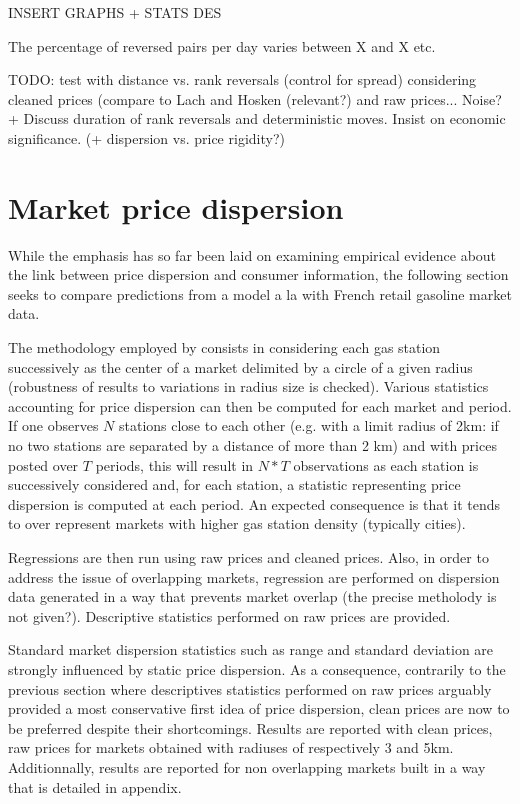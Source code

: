 \documentclass[11pt]{article}
\begin{document}
INSERT GRAPHS + STATS DES

The percentage of reversed pairs per day varies between X and X etc.

TODO: test with distance vs. rank reversals (control for spread) considering cleaned prices (compare to Lach and Hosken (relevant?) and raw prices... Noise? + Discuss duration of rank reversals and deterministic moves. Insist on economic significance. (+ dispersion vs. price rigidity?)

\section{Market price dispersion}

While the emphasis has so far been laid on examining empirical evidence about the link between price dispersion and consumer information, the following section seeks to compare predictions from a model a la \cite{VAR80} with French retail gasoline market data.

The methodology employed by \cite{TAP11} consists in considering each gas station successively as the center of a market delimited by a circle of a given radius (robustness of results to variations in radius size is checked). Various statistics accounting for price dispersion can then be computed for each market and period. If one observes $N$ stations close to each other (e.g. with a limit radius of 2km: if no two stations are separated by a distance of more than 2 km) and with prices posted over $T$ periods, this will result in $N*T$ observations as each station is successively considered and, for each station, a statistic representing price dispersion is computed at each period. An expected consequence is that it tends to over represent markets with higher gas station density (typically cities).

Regressions are then run using raw prices and cleaned prices. Also, in order to address the issue of overlapping markets, regression are performed on dispersion data generated in a way that prevents market overlap (the precise metholody is not given?). Descriptive statistics performed on raw prices are provided.

Standard market dispersion statistics such as range and standard deviation are strongly influenced by static price dispersion. As a consequence, contrarily to the previous section where descriptives statistics performed on raw prices arguably provided a most conservative first idea of price dispersion, clean prices are now to be preferred despite their shortcomings. Results are reported with clean prices, raw prices for markets obtained with radiuses of respectively 3 and 5km. Additionnally, results are reported for non overlapping markets built in a way that is detailed in appendix.
\end{document}
